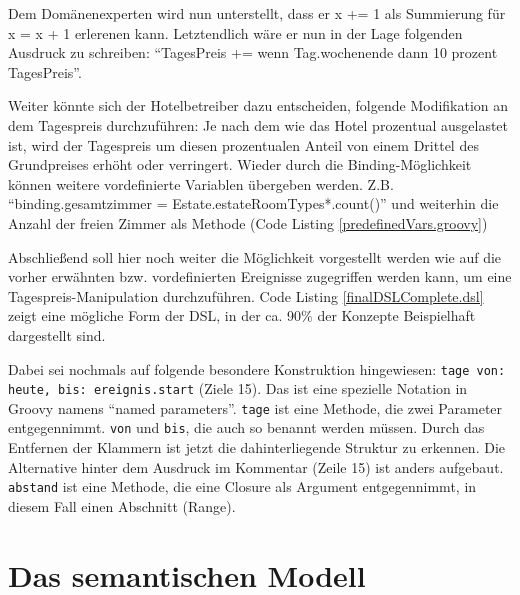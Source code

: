 \documentclass[11pt,english,ngerman, headsepline]{scrreprt}
\begin{document}

 
Dem Domänenexperten wird nun unterstellt, dass er x += 1 als Summierung für x =
x + 1 erlerenen kann. Letztendlich wäre er nun in der Lage folgenden Ausdruck zu
schreiben: ``TagesPreis += wenn Tag.wochenende dann 10 prozent TagesPreis''.
 
Weiter könnte sich der Hotelbetreiber dazu entscheiden, folgende Modifikation an
dem Tagespreis durchzuführen: Je nach dem wie das Hotel prozentual ausgelastet
ist, wird der Tagespreis um diesen prozentualen Anteil von einem Drittel des
Grundpreises erhöht oder verringert.
Wieder durch die Binding-Möglichkeit können weitere vordefinierte Variablen
übergeben werden. Z.B. ``binding.gesamtzimmer =
Estate.estateRoomTypes*.count()'' und weiterhin die Anzahl der freien
Zimmer als Methode (Code Listing \ref{predefinedVars.groovy}) 


 
Abschließend soll hier noch weiter die Möglichkeit vorgestellt werden wie auf
die vorher erwähnten bzw. vordefinierten Ereignisse zugegriffen werden kann, um
eine Tagespreis-Manipulation durchzuführen.
Code Listing \ref{finalDSLComplete.dsl} zeigt eine mögliche Form der DSL, in der
ca. 90\% der Konzepte Beispielhaft dargestellt sind.  



Dabei sei nochmals auf folgende besondere Konstruktion hingewiesen: \texttt{tage
von:
heute, bis: ereignis.start} (Ziele 15). Das ist eine spezielle Notation in
Groovy namens ``named parameters''. \texttt{tage} ist eine Methode, die zwei
Parameter entgegennimmt.
\texttt{von} und \texttt{bis}, die auch so benannt werden müssen. Durch das
Entfernen der Klammern ist jetzt die dahinterliegende Struktur zu erkennen. Die
Alternative hinter dem Ausdruck im Kommentar (Zeile 15) ist anders aufgebaut.
\texttt{abstand} ist eine Methode, die eine Closure als Argument entgegennimmt,
in diesem Fall einen Abschnitt (Range).

\section{Das semantischen Modell}
\end{document}
